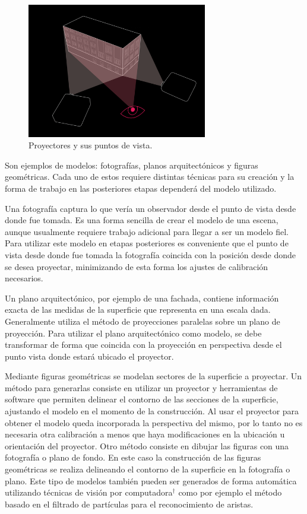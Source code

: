 \begin{figure}[H]
  \centering
    \includegraphics[width=0.7\textwidth]{./Cap2_videomapping/diagrama-2proyectores}
  \caption[http://vvvv.org]{Proyectores y sus puntos de vista.}
  \label{fig:diagrama-2proyectores}
\end{figure}

Son ejemplos de modelos: fotografías, planos arquitectónicos y figuras geométricas.
Cada uno de estos requiere distintas técnicas para su creación y la forma de trabajo en las posteriores etapas dependerá del modelo utilizado.

Una fotografía captura lo que vería un observador desde el punto de vista desde donde fue tomada. Es una forma sencilla de crear el modelo de una escena, aunque usualmente requiere trabajo adicional para llegar a ser un modelo fiel. Para utilizar este modelo en etapas posteriores es conveniente que el punto de vista desde donde fue tomada la fotografía coincida con la posición desde donde se desea proyectar, minimizando de esta forma los ajustes de calibración necesarios.

Un plano arquitectónico, por ejemplo de una fachada, contiene información exacta de las medidas de la superficie que representa en una escala dada. Generalmente utiliza el método de proyecciones paralelas \cite{LibroCompGrafica} sobre un plano de proyección. Para utilizar el plano arquitectónico como modelo, se debe transformar de forma que coincida con la proyección en perspectiva desde el punto vista donde estará ubicado el proyector.

Mediante figuras geométricas se modelan sectores de la superficie a proyectar. Un método para generarlas consiste en utilizar un proyector y herramientas de software que permiten delinear el contorno de las secciones de la superficie, ajustando el modelo en el momento de la construcción. Al usar el proyector para obtener el modelo queda incorporada la perspectiva del mismo, por lo tanto no es necesaria otra calibración a menos que haya modificaciones en la ubicación u orientación del proyector.
Otro método consiste en dibujar las figuras con una fotografía o plano de fondo. En este caso la construcción de las figuras geométricas se realiza delineando el contorno de la superficie en la fotografía o plano.
Este tipo de modelos también pueden ser generados de forma automática utilizando técnicas de visión por computadora$^\dagger$ como por ejemplo el método basado en el filtrado de partículas\cite{ArticuloAutom2dmodel} para el reconocimiento de aristas.

